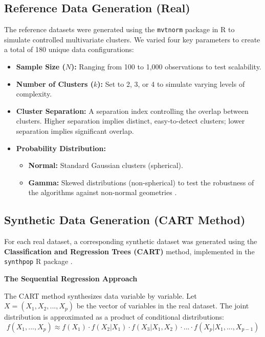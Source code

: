 \subsection{Reference Data Generation (Real)}
The reference datasets were generated using the \texttt{mvtnorm} package in R \cite{mvtnormmanual, genzbretz2009} to simulate controlled multivariate clusters. We varied four key parameters to create a total of 180 unique data configurations:
\begin{itemize}
  \item \textbf{Sample Size ($N$):} Ranging from 100 to 1,000 observations to test scalability.
  \item \textbf{Number of Clusters ($k$):} Set to 2, 3, or 4 to simulate varying levels of complexity.
  \item \textbf{Cluster Separation:} A separation index controlling the overlap between clusters. Higher separation implies distinct, easy-to-detect clusters; lower separation implies significant overlap.
  \item \textbf{Probability Distribution:}
  \begin{itemize}
    \item \textbf{Normal:} Standard Gaussian clusters (spherical).
    \item \textbf{Gamma:} Skewed distributions (non-spherical) to test the robustness of the algorithms against non-normal geometries \cite{yan2007}.
  \end{itemize}
\end{itemize}

\subsection{Synthetic Data Generation (CART Method)}
For each real dataset, a corresponding synthetic dataset was generated using the \textbf{Classification and Regression Trees (CART)} method, implemented in the \texttt{synthpop} R package \cite{nowok2016}.

\textbf{The Sequential Regression Approach}

The CART method synthesizes data variable by variable. Let $X = (X_1, X_2, ..., X_p)$ be the vector of variables in the real dataset. The joint distribution is approximated as a product of conditional distributions:
\begin{equation}
  f(X_1, ..., X_p) \approx f(X_1) \cdot f(X_2|X_1) \cdot f(X_3|X_1, X_2) \cdot ... \cdot f(X_p|X_1, ..., X_{p-1})
\end{equation}


